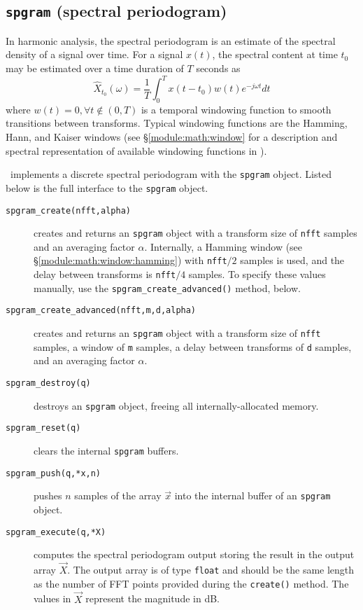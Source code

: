 %

%
%
\subsection{{\tt spgram} (spectral periodogram)}
\label{module:fft:spgram}

In harmonic analysis, the spectral periodogram is an estimate of the
spectral density of a signal over time.
For a signal $x(t)$, the spectral content at time $t_0$ may be estimated
over a time duration of $T$ seconds as
\[
    \hat{X}_{t_0}(\omega) =
        \frac{1}{T} \int_{0}^{T} { x(t-t_0)w(t)e^{-j\omega t} dt }
\]
where $w(t) = 0,\forall t \notin (0,T)$
is a temporal windowing function to smooth transitions
between transforms.
Typical windowing functions are the Hamming, Hann, and Kaiser windows
(see \S\ref{module:math:window} for a description and spectral
representation of available windowing functions in \liquid).

\liquid\ implements a discrete spectral periodogram with the
{\tt spgram} object.
%
Listed below is the full interface to the {\tt spgram} object.
%
\begin{description}
\item[{\tt spgram\_create(nfft,alpha)}]
    creates and returns an {\tt spgram} object with a transform size of
    {\tt nfft} samples and an averaging factor $\alpha$.
    Internally,
    a Hamming window (see \S\ref{module:math:window:hamming})
    with {\tt nfft}$/2$ samples is used,
    and the delay between transforms is {\tt nfft}$/4$ samples.
    To specify these values manually, use the
    {\tt spgram\_create\_advanced()} method, below.
\item[{\tt spgram\_create\_advanced(nfft,m,d,alpha)}]
    creates and returns an {\tt spgram} object with
    a transform size of {\tt nfft} samples,
    a window of {\tt m} samples,
    a delay between transforms of {\tt d} samples,
    and an averaging factor $\alpha$.
\item[{\tt spgram\_destroy(q)}]
    destroys an {\tt spgram} object, freeing all internally-allocated
    memory.
\item[{\tt spgram\_reset(q)}]
    clears the internal {\tt spgram} buffers.
\item[{\tt spgram\_push(q,*x,n)}]
    pushes $n$ samples of the array $\vec{x}$ into the internal buffer
    of an {\tt spgram} object.
\item[{\tt spgram\_execute(q,*X)}]
    computes the spectral periodogram output storing the result in the
    output array $\vec{X}$.
    The output array is of type {\tt float} and should be the
    same length as the number of FFT points provided during the
    {\tt create()} method.
    The values in $\vec{X}$ represent the magnitude in dB.
\end{description}

